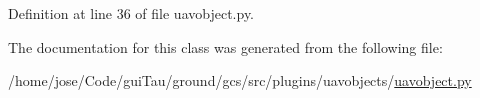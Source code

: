 Definition at line 36 of file uavobject.\-py.



The documentation for this class was generated from the following file\-:\begin{DoxyCompactItemize}
\item 
/home/jose/\-Code/gui\-Tau/ground/gcs/src/plugins/uavobjects/\hyperlink{uavobject_8py}{uavobject.\-py}\end{DoxyCompactItemize}

